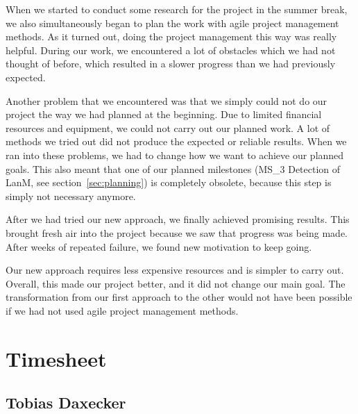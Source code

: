 When we started to conduct some research for the project in the summer break, we also simultaneously began to plan the work with agile project management methods.
As it turned out, doing the project management this way was really helpful.
During our work, we encountered a lot of obstacles which we had not thought of before, which resulted in a slower progress than we had previously expected.

Another problem that we encountered was that we simply could not do our project the way we had planned at the beginning.
Due to limited financial resources and equipment, we could not carry out our planned work.
A lot of methods we tried out did not produce the expected or reliable results.
When we ran into these problems, we had to change how we want to achieve our planned goals.
This also meant that one of our planned milestones (MS\_3 Detection of LanM, see section~\ref{sec:planning}) is completely obsolete, because this step is simply not necessary anymore.

After we had tried our new approach, we finally achieved promising results.
This brought fresh air into the project because we saw that progress was being made.
After weeks of repeated failure, we found new motivation to keep going.

Our new approach requires less expensive resources and is simpler to carry out.
Overall, this made our project better, and it did not change our main goal.
The transformation from our first approach to the other would not have been possible if we had not used agile project management methods.



\newpage


\section{Timesheet}

\subsection{Tobias Daxecker}

